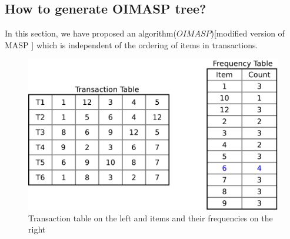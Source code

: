 \documentclass[3p, twocolumn]{elsarticle}
\begin{document}
\subsection{How to generate OIMASP tree?}
In this section, we have proposed an algorithm($ OIMASP $)[modified version of MASP \cite{oldmasp}] which is independent of the ordering of items in transactions.

\begin{figure}
\begin{center}
\includegraphics[scale=0.25]{pdf/itemfreq}
\end{center}
\caption{Transaction table on the left and items and their frequencies on the right}
\label{Fig 5}
\end{figure}
\end{document}
